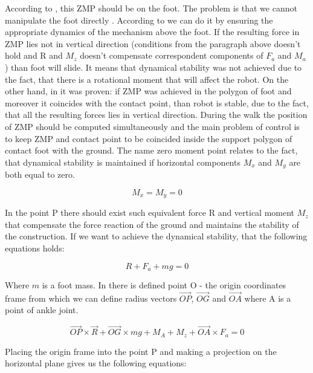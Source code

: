 \documentclass[11pt,a4paper]{report}
\begin{document}
According to \cite{kajita2003biped}, this ZMP should be on the foot. The problem is that we cannot manipulate the foot directly \cite{mitobe2000control}. According to \cite{vukobratovic2004zero} we can do it by ensuring the appropriate dynamics of the mechanism above the foot. If the resulting force in ZMP lies not in vertical direction (conditions from the paragraph above doesn't hold and R and $M_z$ doesn't compensate correspondent components of $F_a$ and $M_a$) than foot will slide. It means that dynamical stability was not achieved due to the fact, that there is a rotational moment that will affect the robot. On the other hand, in \cite{sardain2004forces} it was proven: if ZMP was achieved in the polygon of foot and moreover it coincides with the contact point, than robot is stable, due to the fact, that all the resulting forces lies in vertical direction. During the walk the position of ZMP should be computed simultaneously and the main problem of control is to keep ZMP and contact point to be coincided inside the support polygon of contact foot with the ground.
The name zero moment point relates to the fact, that dynamical stability is maintained if horizontal components $M_x$ and $M_y$ are both equal to zero.
	
	\begin{equation}
		M_x = M_y = 0
	\end{equation}

In the point P there should exist such equivalent force R and vertical moment $M_z$ that compensate the force reaction of the ground and maintains the stability of the construction. If we want to achieve the dynamical stability, that the following equations holds:

	\begin{equation}
		R + F_a + mg = 0
	\end{equation}

Where $m$ is a foot mass. In \cite{vukobratovic2004zero} there is defined  point O - the origin coordinates frame from which we can define radius vectors $\vec{OP}$, $\vec{OG}$ and $\vec{OA}$ where A is a point of ankle joint.

	\begin{equation}
		\vec{OP} \times \vec{R} + \vec{OG} \times mg + M_A + M_z + \vec{OA} \times F_a = 0
	\end{equation}

Placing the origin frame into the point P and making a projection on the horizontal plane gives us the following equations: 
\end{document}
